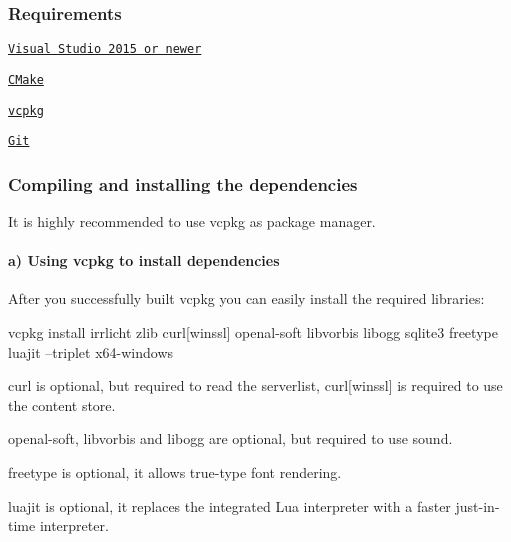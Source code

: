 \subsubsection*{Requirements}


\begin{DoxyItemize}
\item \href{https://visualstudio.microsoft.com}{\tt Visual Studio 2015 or newer}
\item \href{https://cmake.org/download/}{\tt C\+Make}
\item \href{https://github.com/Microsoft/vcpkg}{\tt vcpkg}
\item \href{https://git-scm.com/downloads}{\tt Git}
\end{DoxyItemize}

\subsubsection*{Compiling and installing the dependencies}

It is highly recommended to use vcpkg as package manager.

\paragraph*{a) Using vcpkg to install dependencies}

After you successfully built vcpkg you can easily install the required libraries\+: 
\begin{DoxyCode}
vcpkg install irrlicht zlib curl[winssl] openal-soft libvorbis libogg sqlite3 freetype luajit --triplet
       x64-windows
\end{DoxyCode}



\begin{DoxyItemize}
\item {\ttfamily curl} is optional, but required to read the serverlist, {\ttfamily curl\mbox{[}winssl\mbox{]}} is required to use the content store.
\item {\ttfamily openal-\/soft}, {\ttfamily libvorbis} and {\ttfamily libogg} are optional, but required to use sound.
\item {\ttfamily freetype} is optional, it allows true-\/type font rendering.
\item {\ttfamily luajit} is optional, it replaces the integrated Lua interpreter with a faster just-\/in-\/time interpreter.
\end{DoxyItemize}

